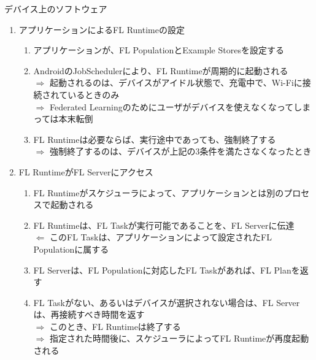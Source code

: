 \documentclass[dvipdfmx,notheorems,t]{beamer}
\begin{document}
\begin{frame}{デバイス上のソフトウェア}

\begin{enumerate}
	\item アプリケーションによるFL Runtimeの設定
	\begin{enumerate}
		\item アプリケーションが、FL PopulationとExample Storesを設定する
		\newline
		\item AndroidのJobSchedulerにより、FL Runtimeが周期的に起動される \\
		$\Rightarrow$ 起動されるのは、デバイスが\alert{アイドル状態}で、\alert{充電中}で、\alert{Wi-Fiに接続}されているときのみ \\
		$\Rightarrow$ Federated Learningのためにユーザがデバイスを使えなくなってしまっては本末転倒
		\newline
		\item FL Runtimeは必要ならば、実行途中であっても、強制終了する \\
		$\Rightarrow$ 強制終了するのは、デバイスが上記の3条件を満たさなくなったとき
	\end{enumerate}
	
	\framebreak
	
	\item FL RuntimeがFL Serverにアクセス
	\begin{enumerate}
		\item FL Runtimeがスケジューラによって、アプリケーションとは別のプロセスで起動される
		\newline
		\item FL Runtimeは、FL Taskが実行可能であることを、FL Serverに伝達 \\
		$\Leftarrow$ このFL Taskは、アプリケーションによって設定されたFL Populationに属する
		\newline
		\item FL Serverは、FL Populationに対応したFL Taskがあれば、FL Planを返す
		\newline
		\item FL Taskがない、あるいはデバイスが選択されない場合は、FL Serverは、再接続すべき時間を返す \\
		$\Rightarrow$ このとき、FL Runtimeは終了する \\
		$\Rightarrow$ 指定された時間後に、スケジューラによってFL Runtimeが再度起動される
	\end{enumerate}
	
	\framebreak
	

\end{enumerate}
\end{frame}
\end{document}
